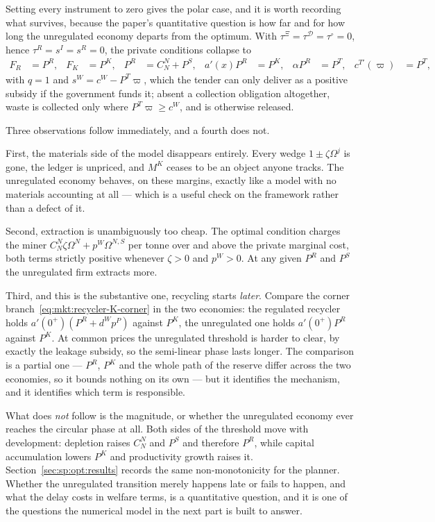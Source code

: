 Setting every instrument to zero gives the polar case, and it is worth recording what survives, because
the paper's quantitative question is how far and for how long the unregulated economy departs from the
optimum. With $\tau^\Xi=\tau^{\mathcal D}=\tau^{\circ}=0$, hence $\tau^R=s^I=s^R=0$, the private
conditions collapse to
\begin{align}
F_R &= P^R,
&
F_K &= P^K,
&
P^R &= C^N_N+P^S,
&
a'\!\left(x\right)P^R &= P^K,
&
\alpha P^R &= P^T,
&
c^{T\prime}\!\left(\varpi\right) &= P^T,
\label{eq:mkt:unregulated}
\end{align}
with $q=1$ and $s^W=c^W-P^T\varpi$, which the tender can only deliver as a positive subsidy if the
government funds it; absent a collection obligation altogether, waste is collected only where
$P^T\varpi\ge c^W$, and is otherwise released.

Three observations follow immediately, and a fourth does not.

First, the materials side of the model disappears entirely. Every wedge $1\pm\zeta\Omega^j$ is gone,
the ledger is unpriced, and $M^K$ ceases to be an object anyone tracks. The unregulated economy
behaves, on these margins, exactly like a model with no materials accounting at all --- which is a
useful check on the framework rather than a defect of it.

Second, extraction is unambiguously too cheap. The optimal condition charges the miner
$C^N_N\zeta\Omega^N+p^W\Omega^{N,S}$ per tonne over and above the private marginal cost, both terms
strictly positive whenever $\zeta>0$ and $p^W>0$. At any given $P^R$ and $P^S$ the unregulated firm
extracts more.

Third, and this is the substantive one, recycling starts \emph{later}. Compare the corner
branch~\eqref{eq:mkt:recycler-K-corner} in the two economies: the regulated recycler holds
$a'\!\left(0^+\right)\left(P^R+d^Wp^P\right)$ against $P^K$, the unregulated one holds
$a'\!\left(0^+\right)P^R$ against $P^K$. At common prices the unregulated threshold is harder to
clear, by exactly the leakage subsidy, so the semi-linear phase lasts longer. The comparison is a
partial one --- $P^R$, $P^K$ and the whole path of the reserve differ across the two economies, so it
bounds nothing on its own --- but it identifies the mechanism, and it identifies which term is
responsible.

What does \emph{not} follow is the magnitude, or whether the unregulated economy ever reaches the
circular phase at all. Both sides of the threshold move with development: depletion raises $C^N_N$ and
$P^S$ and therefore $P^R$, while capital accumulation lowers $P^K$ and productivity growth raises it.
Section~\ref{sec:sp:opt:results} records the same non-monotonicity for the planner. Whether the
unregulated transition merely happens late or fails to happen, and what the delay costs in welfare
terms, is a quantitative question, and it is one of the questions the numerical model in the next part
is built to answer.

